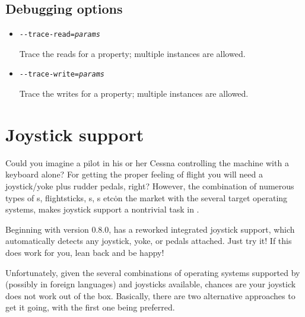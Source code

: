 \subsection{Debugging options}
\begin{itemize}
\item{\texttt{-$ $-trace-read={\it params}}}

  Trace the reads for a property; multiple instances are allowed.

\item{\texttt{-$ $-trace-write={\it params}}}

  Trace the writes for a property; multiple instances are allowed.
\end{itemize}



\section{Joystick support\label{joysticksupp}}
Could you imagine a pilot in his or her Cessna controlling the machine with
a keyboard alone? For getting the proper feeling of flight you will need a
joystick/yoke plus rudder pedals, right? However, the combination of
numerous types of s, flightsticks, s,
s etc\. on the market with the several target operating systems,
makes joystick support a nontrivial task in \FlightGear{}.

Beginning with version 0.8.0, \FlightGear{} has a reworked integrated
joystick support, which automatically detects any joystick, yoke, or pedals
attached. Just try it! If this does work for you, lean back and be happy!

Unfortunately, given the several combinations of operating systems supported
by \FlightGear{} (possibly in foreign languages) and joysticks available,
chances are your joystick does not work out of the box. Basically, there are
two alternative approaches to get it going, with the first one being
preferred.


